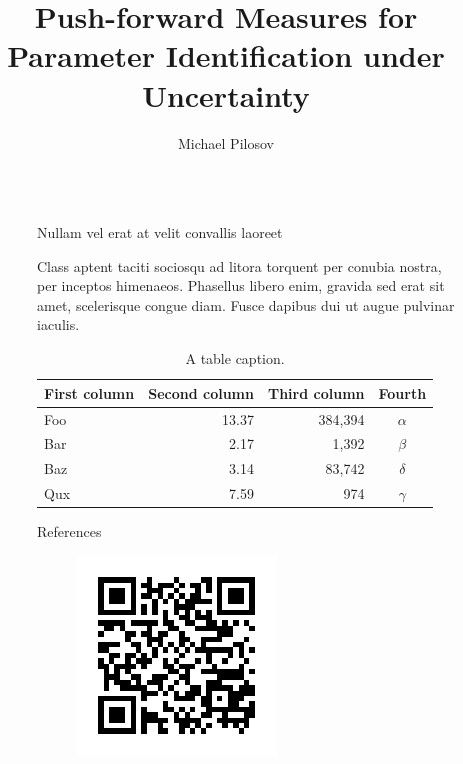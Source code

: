 \documentclass[final]{beamer}
\title{Push-forward Measures for Parameter Identification under Uncertainty}
\author{Michael Pilosov \inst{1}}
\institute[shortinst]{\inst{1} University of Colorado: Denver}
\newlength{\sepwidth}
\newlength{\colwidth}
\newcommand{\separatorcolumn}{\begin{column}{\sepwidth}\end{column}}
\begin{document}
\begin{frame}[t]
\begin{columns}[t]
\separatorcolumn

\begin{column}{\colwidth}

  

\end{column}

\separatorcolumn

\begin{column}{\colwidth}


  

  \begin{block}{Nullam vel erat at velit convallis laoreet}

    Class aptent taciti sociosqu ad litora torquent per conubia nostra, per
    inceptos himenaeos. Phasellus libero enim, gravida sed erat sit amet,
    scelerisque congue diam. Fusce dapibus dui ut augue pulvinar iaculis.

    \begin{table}
      \centering
      \begin{tabular}{l r r c}
        \toprule
        \textbf{First column} & \textbf{Second column} & \textbf{Third column} & \textbf{Fourth} \\
        \midrule
        Foo & 13.37 & 384,394 & $\alpha$ \\
        Bar & 2.17 & 1,392 & $\beta$ \\
        Baz & 3.14 & 83,742 & $\delta$ \\
        Qux & 7.59 & 974 & $\gamma$ \\
        \bottomrule
      \end{tabular}
      \caption{A table caption.}
    \end{table}

  \end{block}

  \begin{block}{References}
    \centering
    \begin{figure}
        \includegraphics{ref1}
    \end{figure}
   

  \end{block}

\end{column}

\separatorcolumn
\end{columns}
\end{frame}
\end{document}

